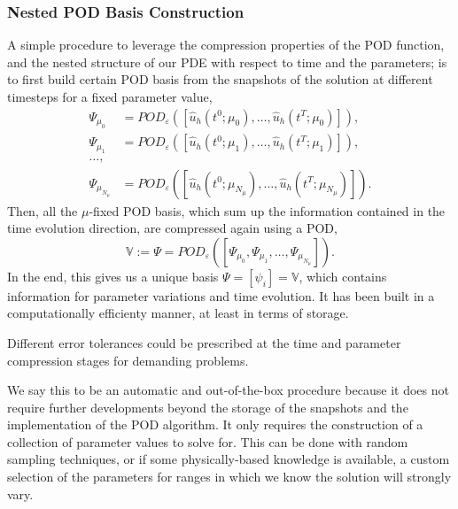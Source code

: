 \documentclass[../../thesis.tex]{subfiles}
\newcommand{\rbV}{\ensuremath{\mathbb{V}}}
\begin{document}
\subsubsection{Nested POD Basis Construction}
\label{sec:1d_rom_burgers_basis_construction_nested}
A simple procedure to leverage the compression properties of the POD function, 
and the nested structure of our PDE with respect to time and the parameters; 
is to first build certain POD basis from the snapshots of the solution at different timesteps for a fixed parameter value,
\begin{align*}
    \Psi_{\mu_0} &= POD_{\varepsilon}\left(\left[\hat{u}_h(t^0; \mu_0), \ldots, \hat{u}_h(t^T; \mu_0)\right]\right), \\
    \Psi_{\mu_1} &= POD_{\varepsilon}\left(\left[\hat{u}_h(t^0; \mu_1), \ldots, \hat{u}_h(t^T; \mu_1)\right]\right), \\  
    \ldots, \\
    \Psi_{\mu_{N_{\mu}}} &= POD_{\varepsilon}\left(\left[\hat{u}_h(t^0; \mu_{N_{\mu}}), \ldots, \hat{u}_h(t^T; \mu_{N_{\mu}})\right]\right).
\end{align*}
Then, all the $\mu$-fixed POD basis, which sum up the information contained in the time evolution direction, are compressed again using a POD,
\begin{equation*}
    \rbV := \Psi = POD_{\varepsilon} \left(\left[\Psi_{\mu_0}, \Psi_{\mu_1}, \ldots, \Psi_{\mu_{N_{\mu}}}\right]\right).
\end{equation*}
In the end, this gives us a unique basis $\Psi = [\psi_i] = \rbV$, 
which contains information for parameter variations and time evolution.
It has been built in a computationally efficienty manner, 
at least in terms of storage.

Different error tolerances could be prescribed at the time and parameter compression stages
for demanding problems.

We say this to be an automatic and out-of-the-box procedure because it does not require further developments 
beyond the storage of the snapshots and the implementation of the POD algorithm.
It only requires the construction of a collection of parameter values to solve for.
This can be done with random sampling techniques, 
or if some physically-based knowledge is available, 
a custom selection of the parameters for ranges in which we know the solution will strongly vary.
\end{document}
